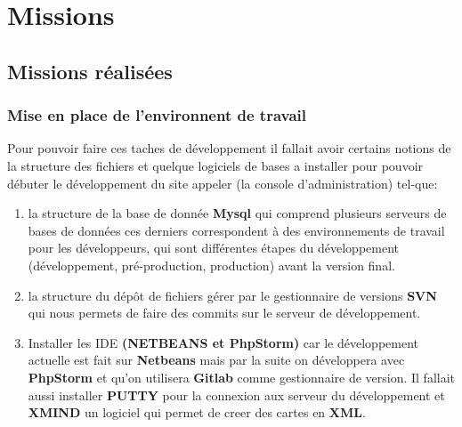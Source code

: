 \section{Missions}

\subsection{Missions réalisées}
\subsubsection{Mise en place de l'environnent de travail}
Pour pouvoir faire ces taches de développement il fallait avoir certains notions de la structure des fichiers et quelque logiciels de bases a installer pour pouvoir débuter le développement du site appeler (la console d'administration) tel-que: 
\begin{enumerate}
\item la structure de la base de donnée \textbf{Mysql} qui comprend plusieurs serveurs de bases de données ces derniers correspondent à des environnements de travail pour les développeurs, qui sont différentes étapes du développement (développement, pré-production, production) avant la version final.
\item la structure du dépôt de fichiers gérer par le gestionnaire de versions \textbf{SVN} qui nous permets de faire des commits sur le serveur de développement.
\item Installer les IDE \textbf{(NETBEANS et PhpStorm)} car le développement actuelle est fait sur \textbf{Netbeans} mais par la suite on développera avec \textbf{PhpStorm} et qu'on utilisera \textbf{Gitlab} comme gestionnaire de version. Il fallait aussi installer \textbf{PUTTY} pour la connexion aux serveur du développement et \textbf{XMIND} un logiciel qui permet de creer des cartes en \textbf{XML}. 
\end{enumerate}
  
